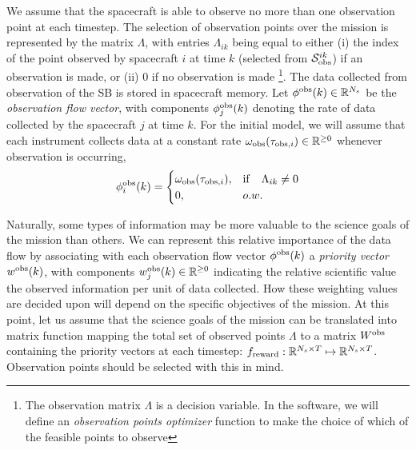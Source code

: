 \documentclass[12pt]{article}
\begin{document}
We assume that the spacecraft is able to observe no more than one observation point at each timestep. The selection of observation points over the mission is represented by the matrix $\Lambda$, with entries $\Lambda_{ik} 
$ being equal to either (i) the index of the point observed by spacecraft $i$ at time $k$ (selected from $\mathcal{S}_{\rm obs}^{ik}$) if an observation is made, or (ii) $0$ if no observation is made
\footnote{The observation matrix $\Lambda$ is a decision variable. In the software, we will define an \textit{observation points optimizer} function to make the choice of which of the feasible points to observe }. 
The data collected from observation of the SB is stored in spacecraft memory. Let $\phi^{\rm obs}(k)\in\mathbb{R}^{N_s}$ be the \textit{observation flow vector}, with components $\phi^{\rm obs}_j(k)$ denoting the rate of data collected by the spacecraft $j$ at time $k$. 
For the initial model, we will assume that each instrument collects data at a constant rate $\omega_{\rm obs}(\tau_{{\rm obs},i})\in\mathbb{R}^{\geq 0}$ whenever observation is occurring,
\begin{equation}
     \phi^{\rm obs}_{i}(k) = 
     \begin{cases}
         \omega_{\rm obs}(\tau_{{\rm obs},i}), & {\rm if} \quad  \Lambda_{ik}\not=0  \\
         0, & o.w.
     \end{cases}
\end{equation}


Naturally, some  types of information may be more valuable to the science goals of the mission than others. 
We can represent this relative importance of the data flow by associating with each observation flow vector $\phi^{\rm obs}(k)$ a \textit{priority vector} $w^{\rm obs}(k)$, with components $w^{\rm obs}_j(k)\in\mathbb{R}^{\geq0}$ indicating the relative scientific value the observed information per unit of data collected. How these weighting values are decided upon will depend on the specific objectives of the mission. At this point, let us assume that the science goals of the mission can be translated into matrix function mapping the total set of observed points $\Lambda$ to a matrix $W^{\rm obs}$ containing the priority vectors at each timestep: $f_{\rm reward}:\mathbb{R}^{N_s \times T} \mapsto \mathbb{R}^{N_s \times T}$. Observation points should be selected with this in mind.  



\end{document}
